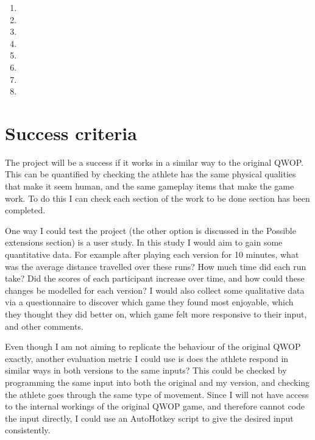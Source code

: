\documentclass[12pt,a4paper,twoside]{article}
\begin{document}
\begin{enumerate}
\item \WorkA
\item \WorkB
\item \WorkC
\item \WorkD
\item \WorkE
\item \WorkF
\item \WorkG
\item \WorkH
\end{enumerate}


\section*{Success criteria}



The project will be a success if it works in a similar way to the original QWOP. This can be quantified by checking the athlete has the same physical qualities that make it seem human, and the same gameplay items that make the game work. To do this I can check each section of the work to be done section has been completed.

One way I could test the project (the other option is discussed in the Possible extensions section) is a user study. In this study I would aim to gain some quantitative data.
For example after playing each version for 10 minutes, what was the average distance travelled over these runs? How much time did each run take? Did the scores of each participant increase over time, and how could these changes be modelled for each version?
I would also collect some qualitative data via a questionnaire to discover which game they found most enjoyable, which they thought they did better on, which game felt more responsive to their input, and other comments.

Even though I am not aiming to replicate the behaviour of the original QWOP exactly, another evaluation metric I could use is does the athlete respond in similar ways in both versions to the same inputs? This could be checked by programming the same input into both the original and my version, and checking the athlete goes through the same type of movement. 
Since I will not have access to the internal workings of the original QWOP game, and therefore cannot code the input directly, I could use an AutoHotkey script to give the desired input consistently.
\end{document}
